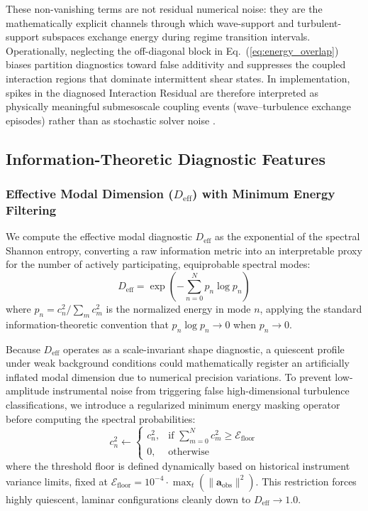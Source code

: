 These non-vanishing terms are not residual numerical noise: they are the mathematically explicit channels through which wave-support and turbulent-support subspaces exchange energy during regime transition intervals. Operationally, neglecting the off-diagonal block in Eq.~(\ref{eq:energy_overlap}) biases partition diagnostics toward false additivity and suppresses the coupled interaction regions that dominate intermittent shear states.
In implementation, spikes in the diagnosed Interaction Residual are therefore interpreted as physically meaningful submesoscale coupling events (wave--turbulence exchange episodes) rather than as stochastic solver noise \citep{Sun2015, Mahrt2010}.


\subsection{Information-Theoretic Diagnostic Features}
\label{sec:methods:diagnostics}

\subsubsection{Effective Modal Dimension (\texorpdfstring{$D_{\mathrm{eff}}$}{Deff}) with Minimum Energy Filtering}

We compute the effective modal diagnostic $D_{\mathrm{eff}}$ as the exponential of the spectral Shannon entropy, converting a raw information metric into an interpretable proxy for the number of actively participating, equiprobable spectral modes:
\begin{equation}
D_{\mathrm{eff}} = \exp\left( -\sum_{n=0}^{N} p_n \log p_n \right)
\label{eq:d_eff_def}
\end{equation}
where $p_n = c_n^2 / \sum_m c_m^2$ is the normalized energy in mode $n$, applying the standard information-theoretic convention that $p_n \log p_n \to 0$ when $p_n \to 0$.

Because $D_{\mathrm{eff}}$ operates as a scale-invariant shape diagnostic, a quiescent profile under weak background conditions could mathematically register an artificially inflated modal dimension due to numerical precision variations. To prevent low-amplitude instrumental noise from triggering false high-dimensional turbulence classifications, we introduce a regularized minimum energy masking operator before computing the spectral probabilities:
\begin{equation}
c_n^2 \leftarrow \begin{cases}
c_n^2, & \text{if } \sum_{m=0}^{N} c_m^2 \ge \mathcal{E}_{\text{floor}} \\
0, & \text{otherwise}
\end{cases}
\label{eq:energy_floor}
\end{equation}
where the threshold floor is defined dynamically based on historical instrument variance limits, fixed at $\mathcal{E}_{\text{floor}} = 10^{-4} \cdot \max_{t} \left(\|\mathbf{a}_{\mathrm{obs}}\|^2\right)$. This restriction forces highly quiescent, laminar configurations cleanly down to $D_{\mathrm{eff}} \to 1.0$.

